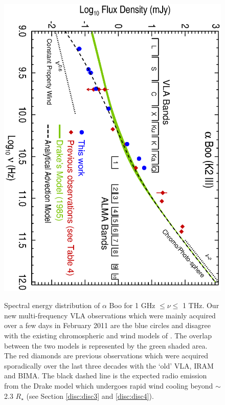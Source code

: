 \documentclass[iop]{emulateapj}
\begin{document}
\begin{figure}
\centering
\includegraphics[trim = 0mm 0mm 0mm 20mm, clip,scale=0.65, angle=90]{fig0.ps}
\\
\caption{Spectral energy distribution of $\alpha$ Boo for 1 GHz $\leq \nu \leq$ 1 THz. Our new multi-frequency VLA observations which were mainly acquired over a few days in February 2011 are the blue circles and disagree with the existing chromospheric and wind models of \cite{1985pssl.proc..351D}. The overlap between the two models is represented by the green shaded area. The red diamonds are previous observations which were acquired sporadically over the last three decades with the `old' VLA, IRAM and BIMA. The black dashed line is the expected radio emission from the Drake model which undergoes rapid wind cooling beyond $\sim$2.3 $R_{\star}$ (see Section \ref{disc:disc3} and \ref{disc:disc4}).}
\label{fig:fig1}
\centering

\end{figure}
\end{document}
